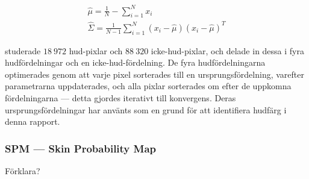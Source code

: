 \documentclass[../rapport_MVEX01-11-05]{subfiles}
\begin{document}
\begin{gather}
  \label{eq:hud:sigmamu}
  \hat\mu    =\frac{1}{N}-\sum_{i=1}^Nx_i\\
  \hat\Sigma =\frac{1}{N-1}\sum_{i=1}^N(x_i-\hat\mu)(x_i-\hat\mu)^T
\end{gather}

 studerade $18\:972$
hud-pixlar och $88\:320$ icke-hud-pixlar, och delade in dessa i fyra
hudfördelningar och en icke-hud-fördelning. De fyra hudfördelningarna
optimerades genom att varje pixel sorterades till en
ursprungsfördelning, varefter parametrarna uppdaterades, och alla
pixlar sorterades om efter de uppkomna fördelningarna --- detta gjordes
iterativt till konvergens. Deras ursprungsfördelningar har använts
som en grund för att identifiera hudfärg i denna rapport.


\subsubsection{SPM --- Skin Probability Map}

Förklara?
\end{document}
